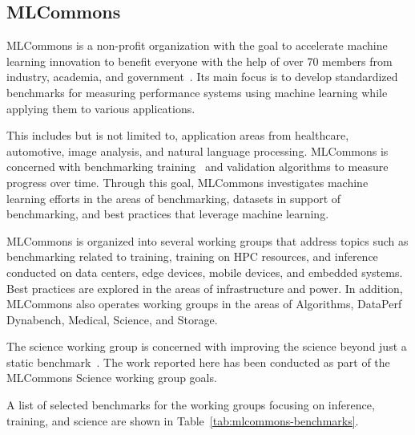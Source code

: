 \documentclass[utf8]{FrontiersinVancouver} %
\begin{document}
\subsection{MLCommons}
\label{sec:mlcommons}

MLCommons is a non-profit organization with the goal to accelerate machine learning innovation to benefit everyone with the help of over 70 members from industry, academia, and government~\citep{www-mlcommons}.  Its main focus is to develop standardized benchmarks for measuring performance systems using machine learning while applying them to various applications.

This includes but is not limited to, application areas from healthcare, automotive, image analysis, and natural language processing. MLCommons is concerned with benchmarking training~\citep{mlperf-training} and validation algorithms to measure progress over time. Through this goal, MLCommons investigates machine learning efforts in the areas of benchmarking, datasets in support of benchmarking, and best practices that leverage machine learning.

MLCommons is organized into several working groups that address topics such as benchmarking related to training, training on HPC resources, and inference conducted on data centers, edge devices, mobile devices, and embedded systems. Best practices are explored in the areas of infrastructure and power. In addition, MLCommons also operates working groups in the areas of Algorithms, DataPerf Dynabench, Medical, Science, and Storage.

The science working group is concerned with improving the science beyond just a static benchmark~\citep{las-22-mlcommons-science}.  The work reported here has been conducted as part of the MLCommons Science working group goals.

A list of selected benchmarks for the working groups focusing on inference, training, and science are shown in Table~\ref{tab:mlcommons-benchmarks}.
\end{document}
